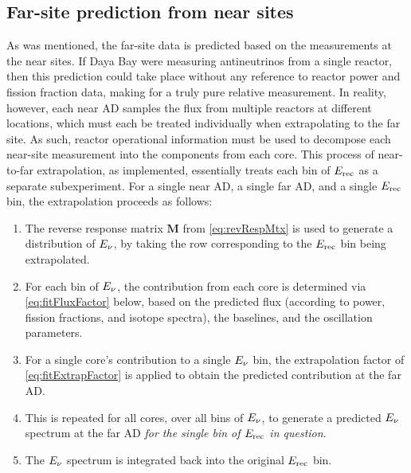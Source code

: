 \documentclass[../thesis.tex]{subfiles}
\begin{document}
\begin{comment}
Compared to the toy Monte Carlo, the LBNL shape fitter is a relatively simple thing.

Its job is just to find the oscillation parameters that best fit the data, i.e. that give the lowest chi2.

It also produces a map of chi2 in parameter space for derivation of contours.
\end{comment}

\subsection{Far-site prediction from near sites}
\label{sec:fitNearToFarPred}

As was mentioned, the far-site data is predicted based on the measurements at the near sites. If Daya Bay were measuring antineutrinos from a single reactor, then this prediction could take place without any reference to reactor power and fission fraction data, making for a truly pure relative measurement. In reality, however, each near AD samples the flux from multiple reactors at different locations, which must each be treated individually when extrapolating to the far site. As such, reactor operational information must be used to decompose each near-site measurement into the components from each core. This process of near-to-far extrapolation, as implemented, essentially treats each bin of $E_\mathrm{rec}$ as a separate subexperiment. For a single near AD, a single far AD, and a single $E_\mathrm{rec}$ bin, the extrapolation proceeds as follows:

\begin{enumerate}
\item The reverse response matrix $\mathbf{M}$ from \autoref{eq:revRespMtx} is used to generate a distribution of $E_\mathrm{\nu}$, by taking the row corresponding to the $E_\mathrm{rec}$ bin being extrapolated.
\item For each bin of $E_\mathrm{\nu}$, the contribution from each core is determined via \autoref{eq:fitFluxFactor} below, based on the predicted flux (according to power, fission fractions, and isotope spectra), the baselines, and the oscillation parameters.
\item For a single core's contribution to a single $E_\mathrm{\nu}$ bin, the extrapolation factor of \autoref{eq:fitExtrapFactor} is applied to obtain the predicted contribution at the far AD.
\item This is repeated for all cores, over all bins of $E_\mathrm{\nu}$, to generate a predicted $E_\mathrm{\nu}$ spectrum at the far AD \emph{for the single bin of $E_\mathrm{rec}$ in question}.
\item The $E_\mathrm{\nu}$ spectrum is integrated back into the original $E_\mathrm{rec}$ bin.
\end{enumerate}
\end{document}
